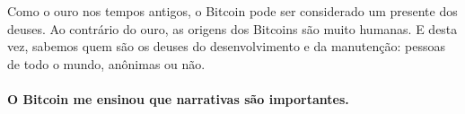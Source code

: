 Como o ouro nos tempos antigos, o Bitcoin pode ser considerado um presente dos deuses. Ao contrário do ouro, as origens dos Bitcoins são muito humanas. E desta vez, sabemos quem são os deuses do desenvolvimento e da manutenção: pessoas de todo o mundo, anônimas ou não.

\paragraph{O Bitcoin me ensinou que narrativas são importantes.}

%
%
%
%

